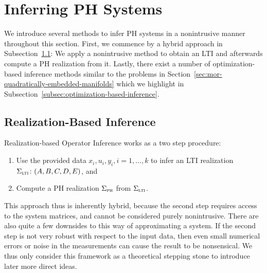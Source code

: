 \section{Inferring \acl{PH} Systems}\label{sec:inferring-ph-systems}

We introduce several methods to infer \ac{PH} systems in a nonintrusive manner throughout this section.
First, we commence by a hybrid approach in Subsection~\ref{subsec:realization-based-inference}: We apply a nonintrusive method to obtain an \ac{LTI} and afterwards compute a \ac{PH} realization from it.
Lastly, there exist a number of optimization-based inference methods similar to the problems in Section~\ref{sec:mor-quadratically-embedded-manifolds} which we highlight in Subsection~\ref{subsec:optimization-based-inference}.

\subsection{Realization-Based Inference}\label{subsec:realization-based-inference}

Realization-based Operator Inference works as a two step procedure:
\begin{enumerate}
    \item Use the provided data $x_i, u_i, y_i, i = 1, \dots, k$ to infer an \ac{LTI} realization $\Sigma_{\textnormal{\scshape lti}} \colon (A, B, C, D, E)$, and
    \item Compute a \ac{PH} realization $\Sigma_{\textnormal{\scshape ph}}$ from $\Sigma_{\textnormal{\scshape lti}}$.
\end{enumerate}
This approach thus is inherently hybrid, because the second step requires access to the system matrices, and cannot be considered purely nonintrusive.
There are also quite a few downsides to this way of approximating a system.
If the second step is not very robust with respect to the input data, then even small numerical errors or noise in the measurements can cause the result to be nonsensical.
We thus only consider this framework as a theoretical stepping stone to introduce later more direct ideas.



